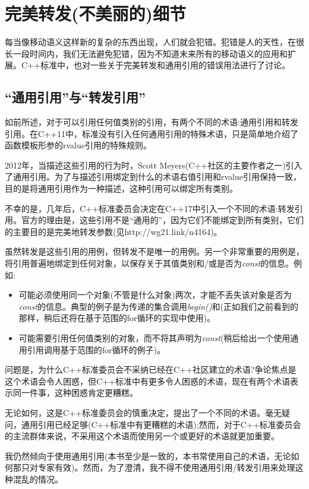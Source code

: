 \section{完美转发(不美丽的)细节}
每当像移动语义这样新的复杂的东西出现，人们就会犯错。犯错是人的天性，在很长一段时间内，我们无法避免犯错，因为不知道未来所有的移动语义的应用和扩展。C++标准中，也对一些关于完美转发和通用引用的错误用法进行了讨论。

\subsection{“通用引用”与“转发引用”}

如前所述，对于可以引用任何值类别的引用，有两个不同的术语:通用引用和转发引用。在C++11中，标准没有引入任何通用引用的特殊术语，只是简单地介绍了函数模板形参的rvalue引用的特殊规则。

2012年，当描述这些引用的行为时，Scott Meyers(C++社区的主要作者之一)引入了通用引用。为了与描述引用绑定到什么的术语右值引用和rvalue引用保持一致，目的是将通用引用作为一种描述，这种引用可以绑定所有类别。

不幸的是，几年后，C++标准委员会决定在C++17中引入一个不同的术语:转发引用。官方的理由是，这些引用不是“通用的”，因为它们不能绑定到所有类别，它们的主要目的是完美地转发参数(见http://wg21.link/n4164)。

虽然转发是这些引用的用例，但转发不是唯一的用例。另一个非常重要的用例是，将引用普遍地绑定到任何对象，以保存关于其值类别和/或是否为\textit{const}的信息。例如:

\begin{itemize}
	\item 可能必须使用同一个对象(不管是什么对象)两次，才能不丢失该对象是否为\textit{const}的信息。典型的例子是为传递的集合调用\textit{begin()}和\textit{}(正如我们之前看到的那样，稍后还将在基于范围的for循环的实现中使用)。
	\item 可能需要引用任何值类别的对象，而不将其声明为\textit{const}(稍后给出一个使用通用引用调用基于范围的for循环的例子)。
\end{itemize}

问题是，为什么C++标准委员会不采纳已经在C++社区建立的术语?争论焦点是这个术语会令人困惑，但C++标准中有更多令人困惑的术语，现在有两个术语表示同一件事，这种困惑肯定更糟糕。

无论如何，这是C++标准委员会的慎重决定，提出了一个不同的术语。毫无疑问，通用引用已经足够(C++标准中有更糟糕的术语);然而，对于C++标准委员会的主流群体来说，不采用这个术语而使用另一个或更好的术语就更加重要。

我仍然倾向于使用通用引用(本书至少是一致的，本书常使用自己的术语，无论如何那只对专家有效)。然而，为了澄清，我不得不使用通用引用/转发引用来处理这种混乱的情况。

